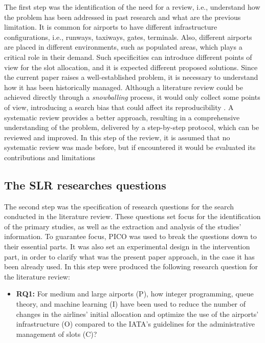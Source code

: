 The first step was the identification of the need for a review, i.e., understand how the problem has been addressed in past research and what are the previous limitation. It is common for airports to have different infrastructure configurations, i.e., runways, taxiways, gates, terminals. Also, different airports are placed in different environments, such as populated areas, which plays a critical role in their demand. Such specificities can introduce different points of view for the slot allocation, and it is expected different proposed solutions. Since the current paper raises a well-established problem, it is necessary to understand how it has been historically managed. Although a literature review could be achieved directly through a \textit{snowballing} process, it would only collect some points of view, introducing a search bias that could affect its reproducibility \cite{jalali2012systematic}. A systematic review provides a better approach, resulting in a comprehensive understanding of the problem, delivered by a step-by-step protocol, which can be reviewed and improved. In this step of the review, it is assumed that no systematic review was made before, but if encountered it would be evaluated its contributions and limitations

\subsection{The \acrshort{SLR} researches questions}

The second step was the specification of research questions for the search conducted in the literature review. These questions set focus for the identification of the primary studies, as well as the extraction and analysis of the studies' information. To guarantee focus, PICO was used to break the questions down to their essential parts. It was also set an experimental design in the intervention part, in order to clarify what was the present paper approach, in the case it has been already used. In this step were produced the following research question for the literature review:
\begin{itemize}
    \item \textbf{RQ1:} For medium and large airports (P), how integer programming, queue theory, and machine learning (I)  have been used to reduce the number of changes in the airlines' initial allocation and optimize the use of the airports' infrastructure (O) compared to the \acrshort{IATA}'s guidelines for the administrative management of slots (C)?
\end{itemize}

